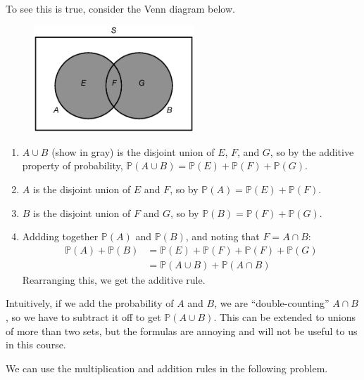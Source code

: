\documentclass[12pt]{article}
\theoremstyle{definition}
\theoremstyle{remark}
\def\P{{\mathbb P}}
\begin{document}
To see this is true, consider the Venn diagram below.
\begin{figure}[H]
\centering
\includegraphics[width=6cm]{additive.eps}
\end{figure}
\begin{enumerate}
\item $A \cup B$ (show in gray) is the disjoint union of $E$, $F$, and $G$, so by the additive property of probability, $\P(A \cup B) = \P(E) + \P(F) + \P(G)$.
\item $A$ is the disjoint union of $E$ and $F$, so by $\P(A) = \P(E) + \P(F)$.
\item $B$ is the disjoint union of $F$ and $G$, so by $\P(B) = \P(F) + \P(G)$.
\item Addding together $\P(A)$ and $\P(B)$, and noting that $F = A \cap B$:
\begin{align*}
\P(A) + \P(B) &= \P(E) + \P(F) + \P(F) + \P(G) \\
&= \P(A \cup B) + \P(A \cap B)
\end{align*}
Rearranging this, we get the additive rule.
\end{enumerate}
Intuitively, if we add the probability of $A$ and $B$, we are ``double-counting'' $A \cap B$, so we have to subtract it off to get $\P(A \cup B)$. This can be extended to unions of more than two sets, but the formulas are annoying and will not be useful to us in this course. 

We can use the multiplication and addition rules in the following problem.
\end{document}
